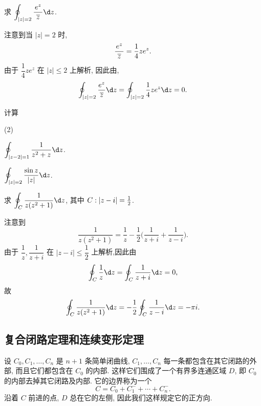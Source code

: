 \begin{example}
  求 $\displaystyle\oint_{|z|=2}\frac{e^z}{~\ov z~}\d z$.
\end{example}
\begin{solution}
  注意到当 $|z|=2$ 时,
  \[
    \frac{e^z}{~\overline z~}=\frac14{ze^z}.
  \]
  由于 $\dfrac14ze^z$ 在 $|z|\le 2$ 上解析,
  因此由\thmCG,
  \[
    \oint_{|z|=2}\frac{e^z}{\ov z}\d z
    =\oint_{|z|=2}\frac14ze^z\d z=0.
  \]
\end{solution}

\begin{exercise}
  计算
  \begin{subsubex}(2)
    \item $\displaystyle\oint_{|z-2|=1}\frac1{z^2+z}\d z$.
    \item $\displaystyle\oint_{|z|=2}\dfrac{\sin z}{|z|}\d z$.
  \end{subsubex}
\end{exercise}

\begin{example}
  求 $\displaystyle\oint_C\frac1{z(z^2+1)}\d z$, 其中 $C:|z-i|=\frac{1}{2} $.
\end{example}

\begin{solution}
  注意到 
  \[
    \dfrac1{z(z^2+1)}=\dfrac1z-\dfrac12\bigl(\dfrac1{z+i}+\dfrac1{z-i}\bigr).
  \]
  由于 $\dfrac1z,\dfrac1{z+i}$ 在 $|z-i|\le\dfrac12$ 上解析,因此由\thmCG
  \[
    \oint_C\frac1z\d z
    =\oint_C\frac1{z+i}\d z=0,
  \]
  故
  \[
    \oint_C\frac1{z(z^2+1)}\d z
    =-\half\oint_C\frac1{z-i}\d z=-\pi i.
  \]
\end{solution}


\subsection{复合闭路定理和连续变形定理}

设 $C_0,C_1,\dots,C_n$ 是 $n+1$ 条简单闭曲线, $C_1,\dots,C_n$ 每一条都包含在其它闭路的外部, 而且它们都包含在 $C_0$ 的内部.
这样它们围成了一个有界多连通区域 $D$, 即 $C_0$ 的内部去掉其它闭路及内部.
它的边界称为一个
\[
  C=C_0+C_1^-+\cdots+C_n^-.
\]
沿着 $C$ 前进的点, $D$ 总在它的左侧, 因此我们这样规定它的正方向.

